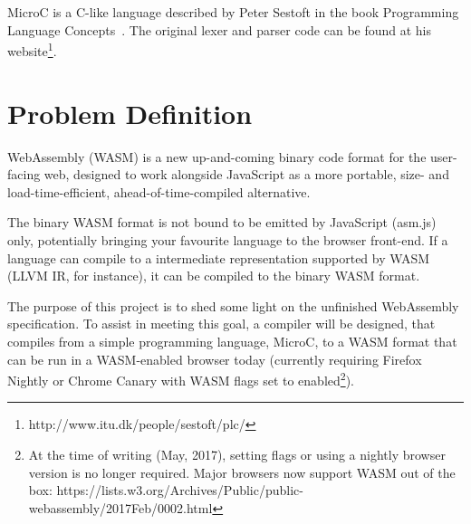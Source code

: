 \documentclass[a4paper]{article}
\begin{document}
MicroC is a C-like language described by Peter Sestoft in the book Programming Language Concepts~\cite{PLC}. The original lexer and parser code can be found at his website\footnote{http://www.itu.dk/people/sestoft/plc/}.

\section{Problem Definition}
\label{sec:problem-definition}
WebAssembly (WASM) is a new up-and-coming binary code format for the user-facing web, designed to work alongside JavaScript as a more portable, size- and load-time-efficient, ahead-of-time-compiled alternative. 

The binary WASM format is not bound to be emitted by JavaScript (asm.js) only, potentially bringing your favourite language to the browser front-end. If a language can compile to a intermediate representation supported by WASM (LLVM IR, for instance), it can be compiled to the binary WASM format. 

The purpose of this project is to shed some light on the unfinished WebAssembly specification. To assist in meeting this goal, a compiler will be designed, that compiles from a simple programming language, MicroC, to a WASM format that can be run in a WASM-enabled browser today (currently requiring Firefox Nightly or Chrome Canary with WASM flags set to enabled\footnote{At the time of writing (May, 2017), setting flags or using a nightly browser version is no longer required. Major browsers now support WASM out of the box: https://lists.w3.org/Archives/Public/public-webassembly/2017Feb/0002.html}).
\end{document}

